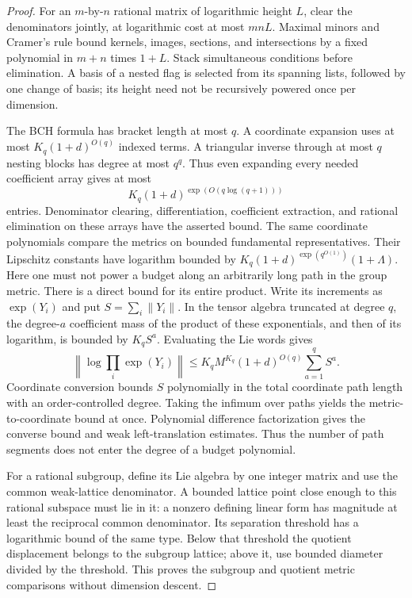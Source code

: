 \documentclass[11pt,a4paper]{article}
\theoremstyle{definition}
\begin{document}
\begin{proof}
For an \(m\)-by-\(n\) rational matrix of logarithmic height \(L\),
clear the denominators jointly, at logarithmic cost at most \(mnL\).
Maximal minors and Cramer's rule bound kernels, images, sections, and
intersections by a fixed polynomial in \(m+n\) times \(1+L\).
Stack simultaneous conditions before elimination. A basis of a nested
flag is selected from its spanning lists, followed by one change of
basis; its height need not be recursively powered once per dimension.

The BCH formula has bracket length at most \(q\). A coordinate
expansion uses at most \(K_q(1+d)^{O(q)}\) indexed terms. A triangular
inverse through at most \(q\) nesting blocks has degree at most
\(q^q\). Thus even expanding every needed coefficient array gives
at most
\[
 K_q(1+d)^{\exp(O(q\log(q+1)))}
\]
entries. Denominator clearing, differentiation, coefficient extraction,
and rational elimination on these arrays have the asserted bound.
The same coordinate polynomials compare the metrics on bounded
fundamental representatives. Their Lipschitz constants have logarithm
bounded by \(K_q(1+d)^{\exp(q^{O(1)})}(1+\Lambda)\).
Here one must not power a budget along an arbitrarily long path in
the group metric. There is a direct bound for its entire product.
Write its increments as \(\exp(Y_i)\) and put
\(S=\sum_i\|Y_i\|\). In the tensor algebra truncated at degree
\(q\), the degree-\(a\) coefficient mass of the product of these
exponentials, and then of its logarithm, is bounded by \(K_qS^a\).
Evaluating the Lie words gives
\[
 \left\|\log\prod_i\exp(Y_i)\right\|
 \le K_qM^{K_q}(1+d)^{O(q)}\sum_{a=1}^q S^a.
\]
Coordinate conversion bounds \(S\) polynomially in the total
coordinate path length with an order-controlled degree. Taking the
infimum over paths yields the metric-to-coordinate bound at once.
Polynomial difference factorization gives the converse bound and
weak left-translation estimates. Thus the number of path segments
does not enter the degree of a budget polynomial.

For a rational subgroup, define its Lie algebra by one integer
matrix and use the common weak-lattice denominator. A bounded
lattice point close enough to this rational subspace must lie in
it: a nonzero defining linear form has magnitude at least the
reciprocal common denominator. Its separation threshold has a
logarithmic bound of the same type. Below that threshold the
quotient displacement belongs to the subgroup lattice; above it,
use bounded diameter divided by the threshold. This proves the
subgroup and quotient metric comparisons without dimension descent.


\end{proof}
\end{document}
